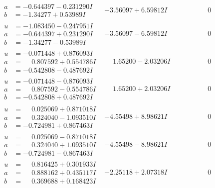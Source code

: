 \documentclass[1p]{elsarticle_modified}
\theoremstyle{definition}
\begin{document}
$$\begin{array}{c|c|c}
\begin{aligned}
a &= -0.644397 - 0.231290 I \\
b &= -1.34277 + 0.53989 I\end{aligned}
 & -3.56097 + 6.59812 I & \phantom{-0.000000 } 0 \\ \hline\begin{aligned}
u &= -1.083450 - 0.247951 I \\
a &= -0.644397 + 0.231290 I \\
b &= -1.34277 - 0.53989 I\end{aligned}
 & -3.56097 - 6.59812 I & \phantom{-0.000000 } 0 \\ \hline\begin{aligned}
u &= -0.071448 + 0.876093 I \\
a &= \phantom{-}0.807592 + 0.554786 I \\
b &= -0.542808 - 0.487692 I\end{aligned}
 & \phantom{-}1.65200 - 2.03206 I & \phantom{-0.000000 } 0 \\ \hline\begin{aligned}
u &= -0.071448 - 0.876093 I \\
a &= \phantom{-}0.807592 - 0.554786 I \\
b &= -0.542808 + 0.487692 I\end{aligned}
 & \phantom{-}1.65200 + 2.03206 I & \phantom{-0.000000 } 0 \\ \hline\begin{aligned}
u &= \phantom{-}0.025069 + 0.871018 I \\
a &= \phantom{-}0.324040 - 1.093510 I \\
b &= -0.724981 + 0.867463 I\end{aligned}
 & -4.55498 + 8.98621 I & \phantom{-0.000000 } 0 \\ \hline\begin{aligned}
u &= \phantom{-}0.025069 - 0.871018 I \\
a &= \phantom{-}0.324040 + 1.093510 I \\
b &= -0.724981 - 0.867463 I\end{aligned}
 & -4.55498 - 8.98621 I & \phantom{-0.000000 } 0 \\ \hline\begin{aligned}
u &= \phantom{-}0.816425 + 0.301933 I \\
a &= \phantom{-}0.888162 + 0.435117 I \\
b &= \phantom{-}0.369688 + 0.168423 I\end{aligned}
 & -2.25118 + 2.07318 I & \phantom{-0.000000 } 0 \\ \hline\begin{aligned}

\end{aligned}
\end{array}$$
\end{document}
